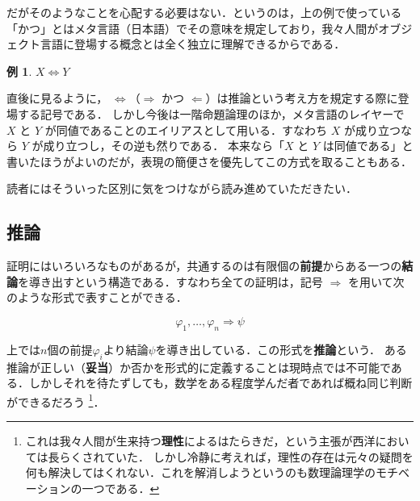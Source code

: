 \documentclass[uplatex,a4paper,dvipdfmx]{jsarticle}
\theoremstyle{definition}
\newtheorem{example}{例}
\begin{document}
            だがそのようなことを心配する必要はない．というのは，上の例で使っている「かつ」とはメタ言語（日本語）でその意味を規定しており，我々人間がオブジェクト言語に登場する概念とは全く独立に理解できるからである．

            \begin{example}
                $X \Longleftrightarrow Y$
            \end{example}
            直後に見るように， $\Leftrightarrow$（$\Rightarrow$ かつ $\Leftarrow$）は推論という考え方を規定する際に登場する記号である．
            しかし今後は一階命題論理のほか，メタ言語のレイヤーで $X$ と $Y$ が同値であることのエイリアスとして用いる．すなわち $X$ が成り立つなら $Y$ が成り立つし，その逆も然りである．
            本来なら「$X$ と $Y$ は同値である」と書いたほうがよいのだが，表現の簡便さを優先してこの方式を取ることもある．

            読者にはそういった区別に気をつけながら読み進めていただきたい．

    \subsection{推論} \label{inference}
        証明にはいろいろなものがあるが，共通するのは有限個の\textbf{前提}からある一つの\textbf{結論}を導き出すという構造である．すなわち全ての証明は，記号 $\Rightarrow$ を用いて次のような形式で表すことができる．

        \begin{equation}
            \varphi_1, \ldots, \varphi_n \Longrightarrow \psi
        \end{equation}

        上では$n$個の前提$\varphi_i$より結論$\psi$を導き出している．この形式を\textbf{推論}という．
        ある推論が正しい（\textbf{妥当}）か否かを形式的に定義することは現時点では不可能である．しかしそれを待たずしても，数学をある程度学んだ者であれば概ね同じ判断ができるだろう
        \footnote{これは我々人間が生来持つ\textbf{理性}によるはたらきだ，という主張が西洋においては長らくされていた．
        しかし冷静に考えれば，理性の存在は元々の疑問を何も解決してはくれない．これを解消しようというのも数理論理学のモチベーションの一つである．}．
\end{document}
